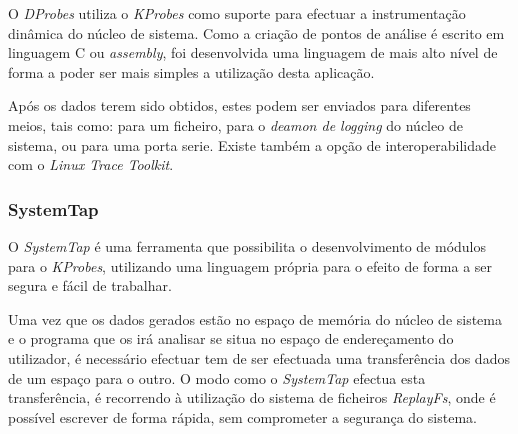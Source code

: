
O \textit{DProbes} utiliza o \textit{KProbes} como suporte para efectuar a instrumentação dinâmica do núcleo de sistema. Como a criação de pontos de análise é escrito em linguagem C ou \textit{assembly}, foi desenvolvida uma linguagem de mais alto nível de forma a poder ser mais simples a utilização desta aplicação.

Após os dados terem sido obtidos, estes podem ser enviados para diferentes meios, tais como: para um ficheiro, para o \textit{deamon de logging} do núcleo de sistema, ou para uma porta serie. Existe também a opção de interoperabilidade com o \textit{Linux Trace Toolkit}\cite{:DProbes}.

\subsubsection{SystemTap}\label{cap:Systemtap_overview}
O \textit{SystemTap} é uma ferramenta que possibilita o desenvolvimento de módulos para o \textit{KProbes}, utilizando uma linguagem própria para o efeito de forma a ser segura e fácil de trabalhar.



Uma vez que os dados gerados estão no espaço de memória do núcleo de sistema e o programa que os irá analisar se situa no espaço de endereçamento do utilizador, é necessário efectuar tem de ser efectuada uma transferência dos dados de um espaço para o outro. O modo como o \textit{SystemTap} efectua esta transferência, é recorrendo à utilização do sistema de ficheiros \textit{ReplayFs}, onde é possível escrever de forma rápida, sem comprometer a segurança do sistema.\cite{Donovan2007,Jones2009} 

